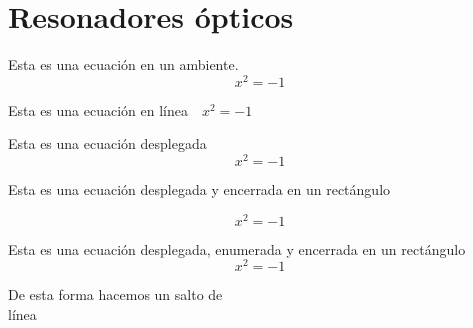\documentclass[10pt,spanish]{book}
\begin{document}
\chapter{Resonadores ópticos}

Esta es una ecuación en un ambiente.
\begin{equation}
x^{2} = -1
\end{equation}

Esta es una ecuación en línea \,\, \( x^{2} = -1\) \newline

Esta es una ecuación desplegada \[ x^{2} = -1\]

Esta es una ecuación desplegada y encerrada en un rectángulo

\[ \boxed{ x^{2} = -1 } \]

Esta es una ecuación desplegada, enumerada y encerrada en un rectángulo
\begin{equation}
\boxed{ x^{2} = -1 }
\end{equation}

De esta forma hacemos un salto de \\ línea 
\newline
\lipsum
\end{document}
